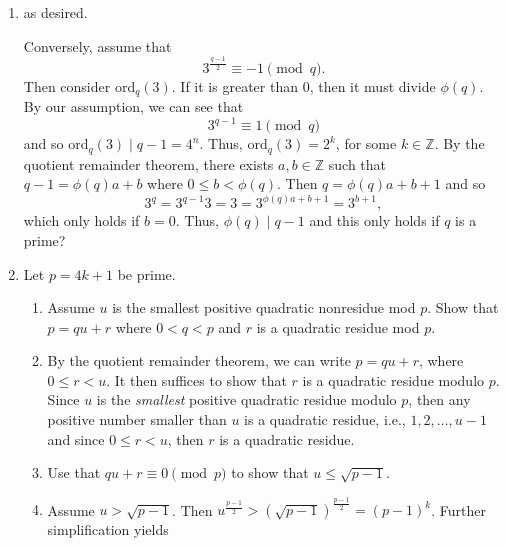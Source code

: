 \documentclass[12pt]{article}
\makeatletter
\theoremstyle{definition}
\theoremstyle{remark}
\renewenvironment{proof}[1][\proofname]{\par
  \pushQED{\qed}%
  \normalfont \topsep6\p@\@plus6\p@\relax
  \list{}{\leftmargin=0mm
          \rightmargin=4mm
          \settowidth{\itemindent}{\itshape#1}%
          \labelwidth=\itemindent
          \parsep=0pt \listparindent=\parindent 
  }
  \item[\hskip\labelsep
        \itshape
    #1\@addpunct{.}]\ignorespaces
}{%
  \popQED\endlist\@endpefalse
}
\let\oldproofname=\proofname
\renewcommand{\proofname}{\bf{\textit{\oldproofname}}}
\makeatother
\begin{document}
\begin{enumerate}[leftmargin=*]
\begin{proof}
                as desired.\par\hspace{4mm} Conversely, assume that 
                    \begin{equation*}
                        3^{\frac{q-1}{2}}\equiv-1\pmod{q}.
                    \end{equation*}
                Then consider ord$_q(3)$. If it is greater than 0, then it must divide $\phi(q)$. By our assumption, we can see that 
                    \begin{equation*}
                        3^{q-1}\equiv 1\pmod{q}
                    \end{equation*}
                and so $\text{ord}_q(3)\mid q-1=4^n$. Thus, $\text{ord}_q(3)=2^{k}$, for some $k\in\mathbb{Z}$. By the quotient remainder theorem, there exists $a,b\in\mathbb{Z}$ such that $q-1=\phi(q)a+b$ where $0\leq b<\phi(q)$. Then $q=\phi(q)a+b+1$ and so
                    \begin{equation*}
                        3^q=3^{q-1}3=3=3^{\phi(q)a+b+1}=3^{b+1},
                    \end{equation*}
                which only holds if $b=0$. Thus, $\phi(q)\mid q-1$ and this only holds if $q$ is a prime?
            \end{proof}
        \item Let $p=4k+1$ be prime.
            \begin{enumerate}
                \item Assume $u$ is the smallest positive quadratic nonresidue mod $p$. Show that $p=qu+r$ where $0<q<p$ and $r$ is a quadratic residue mod $p$.
                    \begin{proof}
                        By the quotient remainder theorem, we can write $p=qu+r$, where $0\leq r<u$. It then suffices to show that $r$ is a quadratic residue modulo $p$. Since $u$ is the \emph{smallest} positive quadratic residue modulo $p$, then any positive number smaller than $u$ is a quadratic residue, i.e., $1,2,\dots,u-1$ and since $0\leq r<u$, then $r$ is a quadratic residue.  
                    \end{proof}
                \item Use that $qu+r\equiv0\pmod{p}$ to show that $u\leq\sqrt{p-1}$.
                    \begin{proof}
                        Assume $u>\sqrt{p-1}$. Then $u^{\frac{p-1}{2}}>(\sqrt{p-1})^{\frac{p-1}{2}}=(p-1)^k$. Further simplification yields
                            \begin{equation*}

\end{equation*}
\end{proof}
\end{enumerate}
\end{enumerate}
\end{document}
